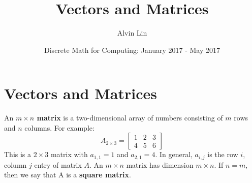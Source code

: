 \documentclass[letterpaper, 12pt]{math}
\title{Vectors and Matrices}
\author{Alvin Lin}
\date{Discrete Math for Computing: January 2017 - May 2017}
\begin{document}
\maketitle

\section*{Vectors and Matrices}
An \textbf{\(m\times n\) matrix} is a two-dimensional array of numbers
consisting of \( m \) rows and \( n \) columns. For example:
\[ A_{2\times3} =
  \begin{bmatrix}
    1 & 2 & 3 \\
    4 & 5 & 6
  \end{bmatrix}
\]
This is a \( 2\times3 \) matrix with \( a_{1,1} = 1 \) and \( a_{2,1} = 4 \).
In general, \( a_{i,j} \) is the row \( i \), column \( j \) entry of matrix
\( A \). An \( m\times n \) matrix has dimension \( m\times n \). If
\( n = m \), then we say that A is a \textbf{square matrix}.
\end{document}
